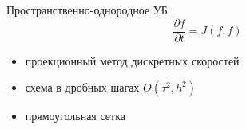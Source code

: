 \documentclass[mathserif]{beamer} %
\newcommand{\pder}[2][]{\frac{\partial#1}{\partial#2}}
\newcommand{\OO}[1]{O(#1)}
\begin{document}
\begin{frame}
\begin{columns}[T]
        \pause
        \begin{column}{6.5cm}
            \begin{block}{Пространственно-однородное УБ}
                \begin{equation}
                    \pder[f]{t} = J(f,f)
                \end{equation}
                \vspace{-15pt}
                \begin{itemize}
                    \item проекционный метод дискретных скоростей
                    \item схема в дробных шагах \(\OO{\tau^2, h^2}\)
                    \item прямоугольная сетка
                \end{itemize}
            \end{block}
        \end{column}
    \end{columns}
\end{frame}
\end{document}
